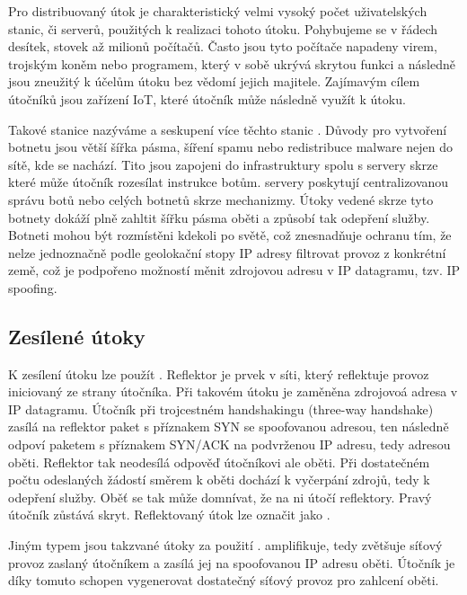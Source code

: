 Pro distribuovaný  útok je charakteristický velmi vysoký počet uživatelských stanic, či serverů, použitých k realizaci tohoto útoku. Pohybujeme se v řádech desítek, stovek až milionů počítačů. 
Často jsou tyto počítače napadeny virem, trojským koněm nebo programem, který v sobě ukrývá skrytou funkci a následně jsou zneužitý k účelům  útoku bez vědomí jejich majitele. Zajímavým cílem útočníků jsou zařízení IoT, které útočník může následně využít k  útoku.

Takové stanice nazýváme  a seskupení více těchto stanic . Důvody pro vytvoření botnetu jsou větší šířka pásma, šíření spamu nebo redistribuce malware nejen do sítě, kde se  nachází. Tito  jsou zapojeni do  infrastruktury spolu s  servery skrze které může útočník rozesílat instrukce botům. %
 servery poskytují centralizovanou správu botů nebo celých botnetů skrze  mechanizmy.
Útoky vedené skrze tyto botnety dokáží plně zahltit šířku pásma oběti a způsobí tak odepření služby. 
Botneti mohou být rozmístěni kdekoli po světě, což znesnadňuje ochranu tím, že nelze jednoznačně podle geolokační stopy IP adresy filtrovat provoz z konkrétní země, což je podpořeno možností měnit zdrojovou adresu v IP datagramu, tzv. IP spoofing.

\subsection{Zesílené útoky}
K zesílení útoku lze použít . Reflektor je prvek v síti, který reflektuje provoz iniciovaný ze strany útočníka. Při takovém útoku je  zaměněna zdrojovoá adresa v IP datagramu. Útočník při trojcestném handshakingu (three-way handshake) zasílá na reflektor paket s příznakem SYN se spoofovanou adresou, ten následně odpoví paketem s příznakem SYN/ACK na podvrženou IP adresu, tedy adresou oběti. Reflektor tak neodesílá odpověď útočníkovi ale oběti. Při dostatečném počtu odeslaných žádostí směrem k oběti dochází k vyčerpání zdrojů, tedy k odepření služby. Oběť se tak může domnívat, že na ni útočí reflektory. Pravý útočník zůstává skryt. Reflektovaný útok lze označit jako .

Jiným typem jsou takzvané  útoky za použití .  amplifikuje, tedy zvětšuje síťový provoz zaslaný útočníkem a zasílá jej na spoofovanou IP adresu oběti. Útočník je díky tomuto schopen vygenerovat dostatečný síťový provoz pro zahlcení oběti.

